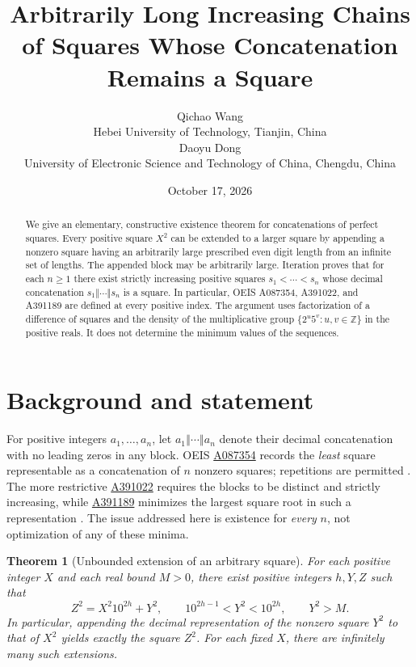 \documentclass[9pt]{extarticle}
\title{Arbitrarily Long Increasing Chains of Squares Whose Concatenation Remains a Square}
\author{Qichao Wang\\{\small Hebei University of Technology, Tianjin, China}\\[0.4em]Daoyu Dong\\{\small University of Electronic Science and Technology of China, Chengdu, China}}
\date{October 17, 2026}\linespread{0.98}\setlength{\abovedisplayskip}{6pt}\setlength{\belowdisplayskip}{6pt}
\newtheorem{theorem}{Theorem}
\newcommand{\cat}{\mathbin{\Vert}}
\begin{document}
\maketitle
\begin{abstract}
We give an elementary, constructive existence theorem for concatenations of
perfect squares. Every positive square $X^2$ can be extended to a larger
square by appending a nonzero square having an arbitrarily large prescribed
even digit length from an infinite set of lengths. The appended block may
be arbitrarily large. Iteration proves that for each $n\ge1$ there exist
strictly increasing positive squares $s_1<\cdots<s_n$ whose decimal
concatenation $s_1\cat\cdots\cat s_n$ is a square. In particular,
OEIS A087354, A391022, and A391189 are defined at every positive index.
The argument uses factorization of a difference of squares and the density
of the multiplicative group $\{2^u5^v:u,v\in\mathbb Z\}$ in the
positive reals. It does not determine the minimum values of the sequences.
\end{abstract}

\section{Background and statement}
For positive integers $a_1,\ldots,a_n$, let
$a_1\cat\cdots\cat a_n$ denote their decimal concatenation with no
leading zeros in any block. OEIS \href{https://oeis.org/A087354}{A087354}
records the \emph{least} square representable as a concatenation of
$n$ nonzero squares; repetitions are permitted \cite{oeis87354}.
The more restrictive \href{https://oeis.org/A391022}{A391022}
requires the blocks to be distinct and strictly increasing, while
\href{https://oeis.org/A391189}{A391189} minimizes the largest
square root in such a representation \cite{oeis391022,oeis391189}.
The issue addressed here is existence for \emph{every} $n$, not
optimization of any of these minima.

\begin{theorem}[Unbounded extension of an arbitrary square]\label{thm:extend}
For each positive integer $X$ and each real bound $M>0$, there exist
positive integers $h,Y,Z$ such that
\begin{equation}\label{eq:extend}
 Z^2=X^2 10^{2h}+Y^2,\qquad
 10^{2h-1}<Y^2<10^{2h},\qquad Y^2>M.
\end{equation}
In particular, appending the decimal representation of the nonzero
square $Y^2$ to that of $X^2$ yields exactly the square $Z^2$.
For each fixed $X$, there are infinitely many such extensions.
\end{theorem}
\end{document}
